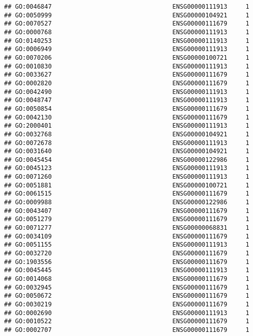 \documentclass[
]{article}
\begin{document}
\begin{verbatim}
## GO:0046847                                 ENSG00000111913     1
## GO:0050999                                 ENSG00000104921     1
## GO:0070527                                 ENSG00000111679     1
## GO:0000768                                 ENSG00000111913     1
## GO:0140253                                 ENSG00000111913     1
## GO:0006949                                 ENSG00000111913     1
## GO:0070206                                 ENSG00000100721     1
## GO:0010830                                 ENSG00000111913     1
## GO:0033627                                 ENSG00000111679     1
## GO:0002820                                 ENSG00000111679     1
## GO:0042490                                 ENSG00000111913     1
## GO:0048747                                 ENSG00000111913     1
## GO:0050854                                 ENSG00000111679     1
## GO:0042130                                 ENSG00000111679     1
## GO:2000401                                 ENSG00000111913     1
## GO:0032768                                 ENSG00000104921     1
## GO:0072678                                 ENSG00000111913     1
## GO:0031640                                 ENSG00000104921     1
## GO:0045454                                 ENSG00000122986     1
## GO:0045123                                 ENSG00000111913     1
## GO:0071260                                 ENSG00000111913     1
## GO:0051881                                 ENSG00000100721     1
## GO:0061515                                 ENSG00000111679     1
## GO:0009988                                 ENSG00000122986     1
## GO:0043407                                 ENSG00000111679     1
## GO:0051279                                 ENSG00000111679     1
## GO:0071277                                 ENSG00000068831     1
## GO:0034109                                 ENSG00000111679     1
## GO:0051155                                 ENSG00000111913     1
## GO:0032720                                 ENSG00000111679     1
## GO:1903556                                 ENSG00000111679     1
## GO:0045445                                 ENSG00000111913     1
## GO:0014068                                 ENSG00000111679     1
## GO:0032945                                 ENSG00000111679     1
## GO:0050672                                 ENSG00000111679     1
## GO:0030219                                 ENSG00000111679     1
## GO:0002690                                 ENSG00000111913     1
## GO:0010522                                 ENSG00000111679     1
## GO:0002707                                 ENSG00000111679     1

\end{verbatim}
\end{document}
